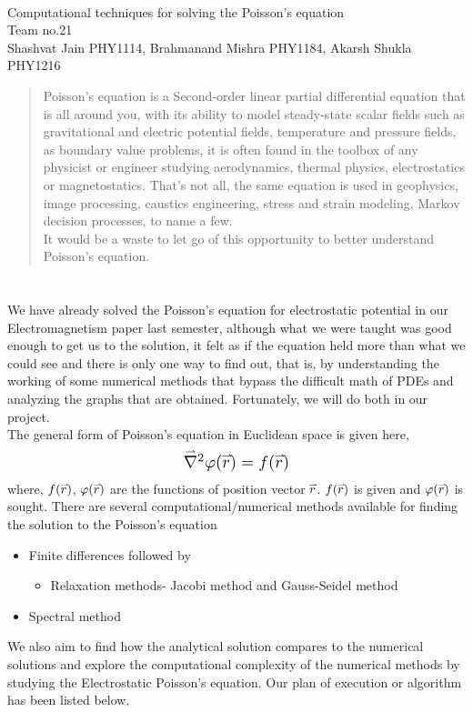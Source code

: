\documentclass[letterpaper,11pt]{article}
\newcommand{\newsection}[1]{\section{\sffamily{\bfseries{#1}}}}
\newcommand{\myvec}[1]{\accentset{\rightharpoonup}{#1}}
\begin{document}
	\begin{center}
		 \\[4mm]
		\large{Computational techniques for solving the Poisson’s equation} \\[4mm]
		\large{\textcolor{greyish}{Team no.21}} \\[1mm]
		\large{\textcolor{greyish}{Shashvat Jain PHY1114, Brahmanand Mishra PHY1184, Akarsh Shukla PHY1216}}\\[3mm]
		\begin{abstract}
			\noindent
			Poisson's equation is a Second-order linear partial differential equation that is all around you, with its ability to model steady-state scalar fields such as gravitational and electric potential fields, temperature and pressure fields, as boundary value problems, it is often found in the toolbox of any physicist or engineer studying aerodynamics, thermal physics, electrostatics or magnetostatics. That’s not all, the same equation is used in geophysics, image processing, caustics engineering, stress and strain modeling, Markov decision processes, to name a few.\\ \noindent
			It would be a waste to let go of this opportunity to better understand Poisson's equation.  
		\end{abstract}	
	\end{center}
	
	\newsection{PROJECT SYNOPSIS}
	\noindent
	We have already solved the Poisson’s equation for electrostatic potential in our Electromagnetism paper last semester, although what we were taught was good enough to get us to the solution, it felt as if the equation held more than what we could see and there is only one way to find out, that is, by understanding the working of some numerical methods that bypass the difficult math of PDEs and analyzing the graphs that are obtained. Fortunately, we will do both in our project.\\
	The general form of Poisson's equation in Euclidean space is given here,
	\[
		\scalebox{1.3}{$\myvec{\nabla}^2 \varphi(\myvec{r}) = f(\myvec{r})$}
	\]
	where, $f(\myvec{r})$, $\varphi(\myvec{r})$ are the functions of position vector $\myvec{r}$. $f(\myvec{r})$ is given and $\varphi(\myvec{r})$ is sought. 
	\noindent
	There are several computational/numerical methods available for finding the solution to the Poisson's equation 
	\begin{itemize}
		\setlength\itemsep{0.01mm}
		\item Finite differences followed by 
		\begin{itemize}
			\item Relaxation methods- Jacobi method and Gauss-Seidel method
		\end{itemize}
		\item Spectral method 
	\end{itemize}
	\noindent
	We also aim to find how the analytical solution compares to the numerical solutions and explore the computational complexity of the numerical methods by studying the Electrostatic Poisson’s equation. Our plan of execution or algorithm has been listed below. 
	
\end{document}
